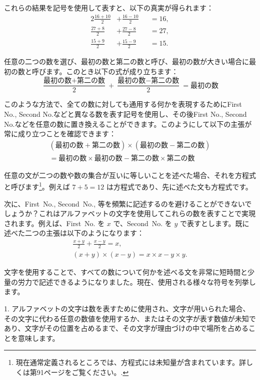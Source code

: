 \documentclass[a4paper,11pt,openany]{ltjsbook}
\newcommand{\Ed}{\text{Ed}}
\begin{document}
これらの結果を記号を使用して表すと、以下の真実が得られます：
\begin{alignat*}{2}
\frac{16 + 10}{2} &+ \frac{16 - 10}{2} &&= 16, \\
\frac{27 + 8}{2} &+ \frac{27 - 8}{2} &&= 27, \\
\frac{15 + 9}{2} &+ \frac{15 - 9}{2} &&= 15.
\end{alignat*}

任意の二つの数を選び、最初の数と第二の数と呼び、最初の数が大きい場合に最初の数と呼びます。このとき以下の式が成り立ちます：
\[
\frac{\text{最初の数} + \text{第二の数}}{2}
+ \frac{\text{最初の数} - \text{第二の数}}{2}
= \text{最初の数}
\]

このような方法で、全ての数に対しても通用する何かを表現するためにFirst No., Second No.などと異なる数を表す記号を使用し、その後First No., Second No.などを任意の数に置き換えることができます。このようにして以下の主張が常に成り立つことを確認できます：
\begin{multline*}
(\text{最初の数} + \text{第二の数}) ×
(\text{最初の数} - \text{第二の数}) \\
= \text{最初の数} × \text{最初の数} - \text{第二の数} × \text{第二の数}
\end{multline*}

任意の文が二つの数や数の集合が互いに等しいことを述べた場合、それを方程式と呼びます\footnote{現在通常定義されるところでは、方程式には未知量が含まれています。詳しくは第91ページをご覧ください。\Ed.}。例えば $7 + 5 = 12$ は方程式であり、先に述べた文も方程式です。

次に、First~No., Second~No., 等を頻繁に記述するのを避けることができないでしょうか？これはアルファベットの文字を使用してこれらの数を表すことで実現されます。例えば、First~No. を $x$ で、Second~No. を $y$ で表すとします。既に述べた二つの主張は以下のようになります：
\begin{gather*}
\frac{x + y}{2} + \frac{x - y}{2} = x, \\
(x + y) \times  (x - y) = x \times  x - y \times  y.
\end{gather*}

文字を使用することで、すべての数について何かを述べる文を非常に短時間と少量の労力で記述できるようになりました。現在、使用される様々な符号を列挙します。

1. アルファベットの文字は数を表すために使用され、文字が用いられた場合、その文字に代わる任意の数値を使用するか、またはその文字が表す数値が未知であり、文字がその位置を占めるまで、その文字が理由づけの中で場所を占めることを意味します。
\end{document}
